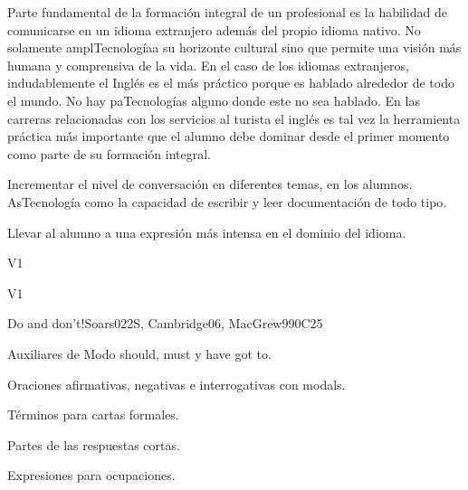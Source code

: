 \begin{syllabus}


\begin{justification}
Parte fundamental de la formación integral de un profesional es la habilidad de comunicarse en un idioma extranjero además del propio idioma nativo. No solamente amplTecnologíaa su horizonte cultural sino que permite una visión más humana y comprensiva de la vida. En el caso de los idiomas extranjeros, indudablemente el Inglés es el 
más práctico porque es hablado alrededor de todo el mundo. No hay paTecnologías alguno donde este no sea hablado. En las carreras relacionadas con los servicios al turista el inglés es tal vez la herramienta práctica más importante que el alumno debe dominar desde el primer momento como parte de su formación integral.
\end{justification}

\begin{goals}
\item Incrementar el nivel de conversación en diferentes temas, en los alumnos. AsTecnología como la capacidad de escribir y leer documentación de todo tipo.
\item Llevar al alumno a una expresión  más intensa en el dominio del idioma.
\end{goals}

\begin{outcomes}{V1}
\item {}
\end{outcomes}

\begin{competences}{V1}
\item {}
\end{competences}

\begin{unit}{Do and don't!}{}{Soars022S, Cambridge06, MacGrew99}{0}{C25}
   \begin{topics}
      \item Auxiliares de Modo should, must y have got to.
      \item Oraciones afirmativas, negativas e interrogativas con modals.
      \item Términos para cartas formales.
      \item Partes de las respuestas cortas.
      \item Expresiones para ocupaciones.
   \end{topics}


\end{unit}
\end{syllabus}
